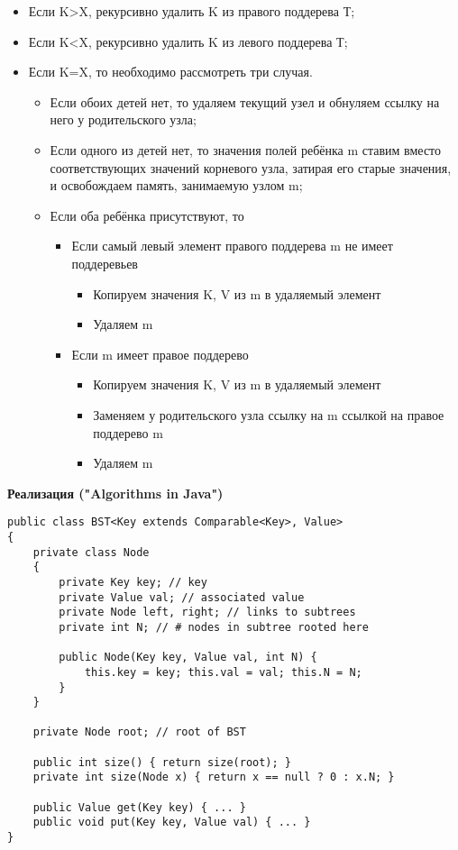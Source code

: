 \begin{itemize}
\item[\labelitemi] Если K>X, рекурсивно удалить K из правого поддерева Т;
\item[\labelitemi] Если K<X, рекурсивно удалить K из левого поддерева Т;
\item[\labelitemi] Если K=X, то необходимо рассмотреть три случая.
\begin{itemize}
\item[\labelitemi] Если обоих детей нет, то удаляем текущий узел и обнуляем ссылку на него у родительского узла;
\item[\labelitemi] Если одного из детей нет, то значения полей ребёнка m ставим вместо соответствующих значений корневого узла, затирая его старые значения, и освобождаем память, занимаемую узлом m;
\item[\labelitemi] Если оба ребёнка присутствуют, то
\begin{itemize}
\item[\labelitemi] Если самый левый элемент правого поддерева m не имеет поддеревьев
\begin{itemize}
\item[\labelitemi] Копируем значения K, V из m в удаляемый элемент
\item[\labelitemi] Удаляем m
\end{itemize}
\item[\labelitemi] Если m имеет правое поддерево
\begin{itemize}
\item[\labelitemi] Копируем значения K, V из m в удаляемый элемент
\item[\labelitemi] Заменяем у родительского узла ссылку на m ссылкой на правое поддерево m
\item[\labelitemi] Удаляем m
\end{itemize}
\end{itemize}
\end{itemize}
\end{itemize}
{\bf Реализация ("Algorithms in Java")}
\begin{verbatim}
public class BST<Key extends Comparable<Key>, Value>
{
    private class Node
    {
        private Key key; // key
        private Value val; // associated value
        private Node left, right; // links to subtrees
        private int N; // # nodes in subtree rooted here
        
        public Node(Key key, Value val, int N) {
            this.key = key; this.val = val; this.N = N;
        }
    }
    
    private Node root; // root of BST
    
    public int size() { return size(root); }
    private int size(Node x) { return x == null ? 0 : x.N; }
    
    public Value get(Key key) { ... }
    public void put(Key key, Value val) { ... }
}
\end{verbatim}
